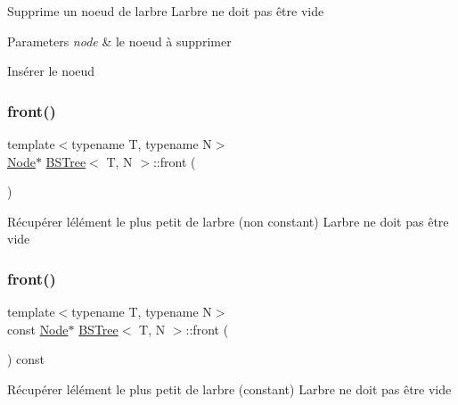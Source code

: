 Supprime un noeud de l\textquotesingle{}arbre L\textquotesingle{}arbre ne doit pas être vide


\begin{DoxyParams}{Parameters}
{\em node} & le noeud à supprimer \\
\hline
\end{DoxyParams}
Insérer le noeud \mbox{\label{classBSTree_ad43333217921c01d7ea8af358c6b22af}} 
\subsubsection{\texorpdfstring{front()}{front()}\hspace{0.1cm}{\footnotesize\ttfamily [1/2]}}
{\footnotesize\ttfamily template$<$typename T, typename N$>$ \\
\hyperlink{classBSTree_a9c1a06548b3ff425e1d906f17ce2c858}{Node}$\ast$ \hyperlink{classBSTree}{B\+S\+Tree}$<$ T, N $>$\+::front (\begin{DoxyParamCaption}{ }\end{DoxyParamCaption})\hspace{0.3cm}{\ttfamily [inline]}}

Récupérer l\textquotesingle{}élément le plus petit de l\textquotesingle{}arbre (non constant) L\textquotesingle{}arbre ne doit pas être vide \mbox{\label{classBSTree_a015c11f386bc9f0e8b6ae9351de8daa3}} 
\subsubsection{\texorpdfstring{front()}{front()}\hspace{0.1cm}{\footnotesize\ttfamily [2/2]}}
{\footnotesize\ttfamily template$<$typename T, typename N$>$ \\
const \hyperlink{classBSTree_a9c1a06548b3ff425e1d906f17ce2c858}{Node}$\ast$ \hyperlink{classBSTree}{B\+S\+Tree}$<$ T, N $>$\+::front (\begin{DoxyParamCaption}{ }\end{DoxyParamCaption}) const\hspace{0.3cm}{\ttfamily [inline]}}

Récupérer l\textquotesingle{}élément le plus petit de l\textquotesingle{}arbre (constant) L\textquotesingle{}arbre ne doit pas être vide \mbox{\label{classBSTree_ad8e76b92cb078260a0e16db55b0ddf00}} 
